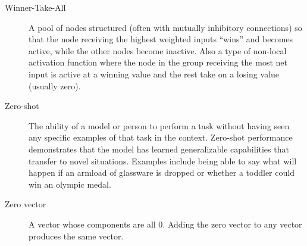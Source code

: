 \begin{description}
\item[Winner-Take-All] A pool of nodes structured (often with mutually inhibitory connections) so that the node receiving the highest weighted inputs ``wins'' and becomes active, while the other nodes become inactive. Also a type of non-local activation function where the node in the group receiving the most net input is active at a winning value and the rest take on a losing value (usually zero). 

\item[Zero-shot] The ability of a model or person to perform a task without having seen any specific examples of that task in the context. Zero-shot performance demonstrates that the model has learned generalizable capabilities that transfer to novel situations. Examples include being able to say what will happen if an armload of glassware is dropped or whether a toddler could win an olympic medal.

\item[Zero vector] A vector whose components are all $0$. Adding the zero vector to any vector produces the same vector.

\end{description}